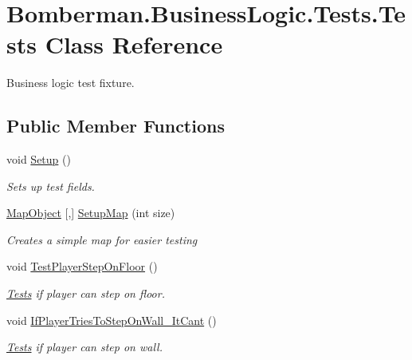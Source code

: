 \hypertarget{class_bomberman_1_1_business_logic_1_1_tests_1_1_tests}{}\section{Bomberman.\+Business\+Logic.\+Tests.\+Tests Class Reference}
\label{class_bomberman_1_1_business_logic_1_1_tests_1_1_tests}


Business logic test fixture.  


\subsection*{Public Member Functions}
\begin{DoxyCompactItemize}
\item 
void \mbox{\hyperlink{class_bomberman_1_1_business_logic_1_1_tests_1_1_tests_abd8cb0b5bcdb7bc95afd06e338a68fba}{Setup}} ()
\begin{DoxyCompactList}\small\item\em Sets up test fields. \end{DoxyCompactList}\item 
\mbox{\hyperlink{class_bomberman_1_1_model_1_1_map_object}{Map\+Object}} \mbox{[},\mbox{]} \mbox{\hyperlink{class_bomberman_1_1_business_logic_1_1_tests_1_1_tests_a539a4ac94b7e7f236b370b9376c88665}{Setup\+Map}} (int size)
\begin{DoxyCompactList}\small\item\em Creates a simple map for easier testing \end{DoxyCompactList}\item 
void \mbox{\hyperlink{class_bomberman_1_1_business_logic_1_1_tests_1_1_tests_a0962f6636e800610fd22448371f7e7d4}{Test\+Player\+Step\+On\+Floor}} ()
\begin{DoxyCompactList}\small\item\em \mbox{\hyperlink{class_bomberman_1_1_business_logic_1_1_tests_1_1_tests}{Tests}} if player can step on floor. \end{DoxyCompactList}\item 
void \mbox{\hyperlink{class_bomberman_1_1_business_logic_1_1_tests_1_1_tests_ab7de5e1efa237dffdcd03cbb9235aac6}{If\+Player\+Tries\+To\+Step\+On\+Wall\+\_\+\+It\+Cant}} ()
\begin{DoxyCompactList}\small\item\em \mbox{\hyperlink{class_bomberman_1_1_business_logic_1_1_tests_1_1_tests}{Tests}} if player can step on wall. \end{DoxyCompactList}\item 

\end{DoxyCompactItemize}
